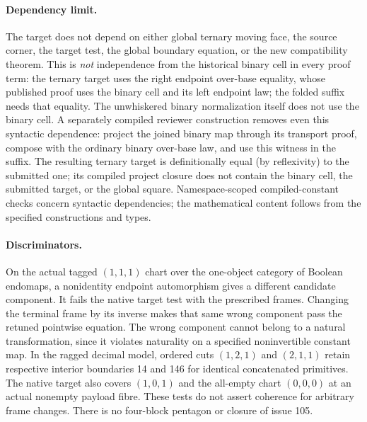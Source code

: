 \documentclass{article}
\begin{document}
\paragraph{Dependency limit.} The target does not depend on either global ternary moving face, the source corner, the target test, the global boundary equation, or the new compatibility theorem. This is \emph{not} independence from the historical binary cell in every proof term: the ternary target uses the right endpoint over-base equality, whose published proof uses the binary cell and its left endpoint law; the folded suffix needs that equality. The unwhiskered binary normalization itself does not use the binary cell. A separately compiled reviewer construction removes even this syntactic dependence: project the joined binary map through its transport proof, compose with the ordinary binary over-base law, and use this witness in the suffix. The resulting ternary target is definitionally equal (by reflexivity) to the submitted one; its compiled project closure does not contain the binary cell, the submitted target, or the global square. Namespace-scoped compiled-constant checks concern syntactic dependencies; the mathematical content follows from the specified constructions and types.
\paragraph{Discriminators.}
On the actual tagged $(1,1,1)$ chart over the one-object category of Boolean endomaps, a nonidentity endpoint automorphism gives a different candidate component. It fails the native target test with the prescribed frames. Changing the terminal frame by its inverse makes that same wrong component pass the retuned pointwise equation. The wrong component cannot belong to a natural transformation, since it violates naturality on a specified noninvertible constant map. In the ragged decimal model, ordered cuts $(1,2,1)$ and $(2,1,1)$ retain respective interior boundaries 14 and 146 for identical concatenated primitives. The native target also covers $(1,0,1)$ and the all-empty chart $(0,0,0)$ at an actual nonempty payload fibre. These tests do not assert coherence for arbitrary frame changes. There is no four-block pentagon or closure of issue 105.
\end{document}
